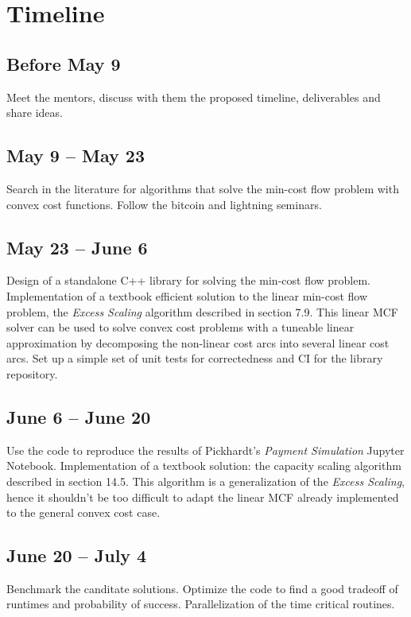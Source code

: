 \section{Timeline}

    \subsection*{Before May 9}
    Meet the mentors, discuss with them the proposed timeline,
    deliverables and share ideas.

    \subsection*{May 9 -- May 23}
    Search in the literature for algorithms that solve the min-cost flow problem
    with convex cost functions. 
    Follow the bitcoin and lightning seminars.
    
    \subsection*{May 23 -- June 6}
    Design of a standalone C++ library for solving the min-cost flow problem.
    Implementation of a textbook efficient solution to the linear min-cost flow
    problem, the \emph{Excess Scaling} algorithm described in 
    \cite{ahuja1993network} section 7.9.
    This linear MCF solver can be used to solve convex cost problems with a
    tuneable linear approximation by decomposing the non-linear cost arcs into
    several linear cost arcs.
    Set up a simple set of unit tests for correctedness and CI for the library
    repository.
    
    \subsection*{June 6 -- June 20}
    Use the code to reproduce the results 
    of Pickhardt's \emph{Payment Simulation} Jupyter Notebook.
    Implementation of a textbook solution: the capacity scaling algorithm described in
    \cite{ahuja1993network} section 14.5. This algorithm is a generalization of
    the \emph{Excess Scaling}, hence it shouldn't be too difficult to adapt
    the linear MCF already implemented to the general convex cost case.
    
    \subsection*{June 20 -- July 4}
    Benchmark the canditate solutions.
    Optimize the code to find a good tradeoff of runtimes and probability of
    success.
    Parallelization of the time critical routines.
    
